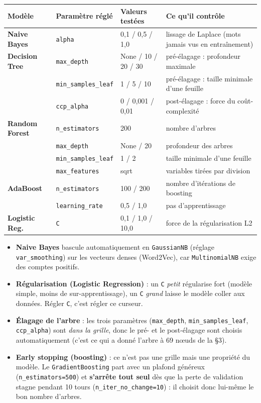 \documentclass[10.5pt,a4paper]{article}
\begin{document}
\begin{center}
\begin{tabular}{lll>{\raggedright\arraybackslash}p{5.0cm}}
\toprule
Modèle & Paramètre réglé & Valeurs testées & Ce qu'il contrôle \\
\midrule
\textbf{Naive Bayes} & \texttt{alpha} & 0,1 / 0,5 / 1,0 & lissage de Laplace (mots jamais vus en entraînement) \\
\textbf{Decision Tree} & \texttt{max\_depth} & None / 10 / 20 / 30 & pré-élagage : profondeur maximale \\
                       & \texttt{min\_samples\_leaf} & 1 / 5 / 10 & pré-élagage : taille minimale d'une feuille \\
                       & \texttt{ccp\_alpha} & 0 / 0,001 / 0,01 & post-élagage : force du coût-complexité \\
\textbf{Random Forest} & \texttt{n\_estimators} & 200 & nombre d'arbres \\
                       & \texttt{max\_depth} & None / 20 & profondeur des arbres \\
                       & \texttt{min\_samples\_leaf} & 1 / 2 & taille minimale d'une feuille \\
                       & \texttt{max\_features} & sqrt & variables tirées par division \\
\textbf{AdaBoost} & \texttt{n\_estimators} & 100 / 200 & nombre d'itérations de boosting \\
                  & \texttt{learning\_rate} & 0,5 / 1,0 & pas d'apprentissage \\
\textbf{Logistic Reg.} & \texttt{C} & 0,1 / 1,0 / 10,0 & force de la régularisation L2 \\
\bottomrule
\end{tabular}
\end{center}

\begin{itemize}[leftmargin=1.3em,itemsep=1pt,topsep=2pt]
\item \textbf{Naive Bayes} bascule automatiquement en \texttt{GaussianNB} (réglage \texttt{var\_smoothing}) sur les vecteurs denses (Word2Vec), car \texttt{MultinomialNB} exige des comptes positifs.
\item \textbf{Régularisation (Logistic Regression)} : un \texttt{C} \emph{petit} régularise fort (modèle simple, moins de sur-apprentissage), un \texttt{C} \emph{grand} laisse le modèle coller aux données. Régler \texttt{C}, c'est régler ce curseur.
\item \textbf{Élagage de l'arbre} : les trois paramètres (\texttt{max\_depth}, \texttt{min\_samples\_leaf}, \texttt{ccp\_alpha}) sont \emph{dans la grille}, donc le pré- et le post-élagage sont choisis automatiquement (c'est ce qui a donné l'arbre à 69 nœuds de la §3).
\item \textbf{Early stopping (boosting)} : ce n'est pas une grille mais une propriété du modèle. Le \texttt{GradientBoosting} part avec un plafond généreux (\texttt{n\_estimators=500}) et \textbf{s'arrête tout seul} dès que la perte de validation stagne pendant 10 tours (\texttt{n\_iter\_no\_change=10}) : il choisit donc lui-même le bon nombre d'arbres.
\end{itemize}
\end{document}

